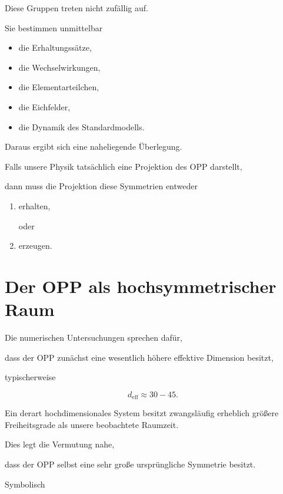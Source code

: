 Diese Gruppen treten nicht zufällig auf.

Sie bestimmen unmittelbar

\begin{itemize}

\item die Erhaltungssätze,

\item die Wechselwirkungen,

\item die Elementarteilchen,

\item die Eichfelder,

\item die Dynamik des Standardmodells.

\end{itemize}

Daraus ergibt sich eine naheliegende Überlegung.

Falls unsere Physik tatsächlich eine Projektion des OPP darstellt,

dann muss die Projektion diese Symmetrien entweder

\begin{enumerate}

\item erhalten,

oder

\item erzeugen.

\end{enumerate}

\section*{Der OPP als hochsymmetrischer Raum}

Die numerischen Untersuchungen sprechen dafür,

dass der OPP zunächst eine wesentlich höhere effektive Dimension besitzt,

typischerweise

\[
d_{\mathrm{eff}}
\approx
30
-
45.
\]

Ein derart hochdimensionales System besitzt zwangsläufig erheblich größere Freiheitsgrade als unsere beobachtete Raumzeit.

Dies legt die Vermutung nahe,

dass der OPP selbst eine sehr große ursprüngliche Symmetrie besitzt.

Symbolisch

